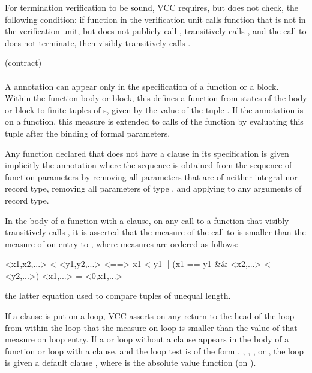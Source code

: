 \documentclass[preprint,nocopyrightspace]{sigplanconf}
\begin{document}
{{{\begin{VCC}
For termination verification to be sound, VCC requires, but does not
check, the following condition: if function  in the
verification unit calls function  that is not in the
verification unit, but does not publicly call , 
transitively calls , and the call to  does not
terminate, then  visibly transitively calls .

 (contract)\\
\\
A  annotation can appear only in the specification of a function or
a block. Within the
function body or block, this defines a function from states of the
body or block to finite tuples of \vcc{\natural}s, given by the value
of the tuple . If the annotation is on a function,
this measure is extended to calls of the function by evaluating this
tuple after the binding of formal parameters. 

Any function declared  that does not have
a  clause in its specification is given implicitly
the annotation  where the
sequence  is obtained from the sequence of function
parameters by removing all parameters that are of neither 
integral nor record type, removing all parameters of type \vcc{\bool},
and applying  to any arguments of record type.

In the body of a function  with a  clause, on
any call to a function  that visibly transitively calls ,
it is asserted that the measure of the call to  is smaller
than the measure of  on entry to , where measures are
ordered as follows:
\begin{VCC}
<x1,x2,...> < <y1,y2,...> <==> x1 < y1 || (x1 == y1 && <x2,...> < <y2,...>)
<x1,...> = <0,x1,...>
\end{VCC}
the latter equation used to compare tuples of unequal length.

If a  clause is put on a loop, VCC asserts on any
return to the head of the loop from within the loop that the measure
on loop is smaller than the value of that measure on loop entry. If a
 or  loop without a  clause appears in the body of a function
or loop with a  clause, and the loop test is of the
form , , , ,
or , the loop is given a default clause 
, where  is the absolute value function
(on \vcc{\integer}). 


\end{VCC}}}}
\end{document}
